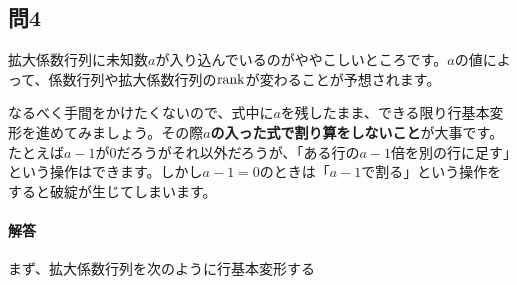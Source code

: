 \subsection{問4}

拡大係数行列に未知数$a$が入り込んでいるのがややこしいところです。$a$の値によって、係数行列や拡大係数行列の$\operatorname{rank}$が変わることが予想されます。

なるべく手間をかけたくないので、式中に$a$を残したまま、できる限り行基本変形を進めてみましょう。その際\textbf{$a$の入った式で割り算をしないこと}が大事です。たとえば$a - 1$が$0$だろうがそれ以外だろうが、「ある行の$a - 1$倍を別の行に足す」という操作はできます。しかし$a - 1 = 0$のときは「$a - 1$で割る」という操作をすると破綻が生じてしまいます。

\paragraph{解答} まず、拡大係数行列を次のように行基本変形する
